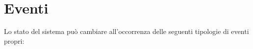 \section{Eventi}\label{sec:modello-computazionale-eventi}
Lo stato del sistema può cambiare all'occorrenza delle seguenti tipologie di eventi propri:


